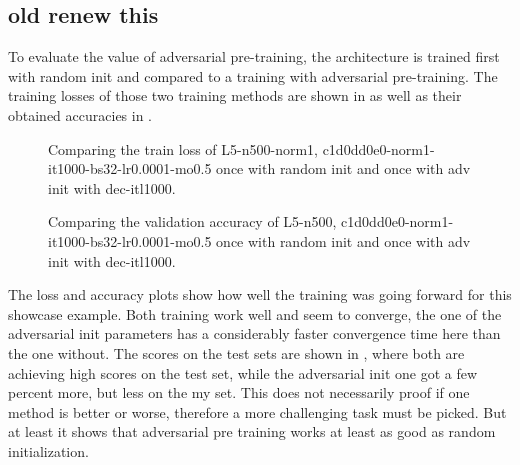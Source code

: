 \subsection{old renew this}
To evaluate the value of adversarial pre-training, the architecture is trained first with random init and compared to a training with adversarial pre-training. 
The training losses of those two training methods are shown in  as well as their obtained accuracies in .

\begin{figure}[!ht]
  \centering
  \caption{Comparing the train loss of L5-n500-norm1, c1d0dd0e0-norm1-it1000-bs32-lr0.0001-mo0.5 once with random init and once with adv init with dec-itl1000.}
  \label{fig:exp_adv_fc3_train_loss}
\end{figure}
\FloatBarrier
\noindent

\begin{figure}[!ht]
  \centering
  \caption{Comparing the validation accuracy of L5-n500, c1d0dd0e0-norm1-it1000-bs32-lr0.0001-mo0.5 once with random init and once with adv init with dec-itl1000.}
  \label{fig:exp_adv_fc3_val_acc}
\end{figure}
\FloatBarrier
\noindent

The loss and accuracy plots show how well the training was going forward for this showcase example. Both training work well and seem to converge, the one of the adversarial init parameters has a considerably faster convergence time here than the one without.
The scores on the test sets are shown in , where both are achieving high scores on the test set, while the adversarial init one got a few percent more, but less on the my set.
This does not necessarily proof if one method is better or worse, therefore a more challenging task must be picked.
But at least it shows that adversarial pre training works at least as good as random initialization.
